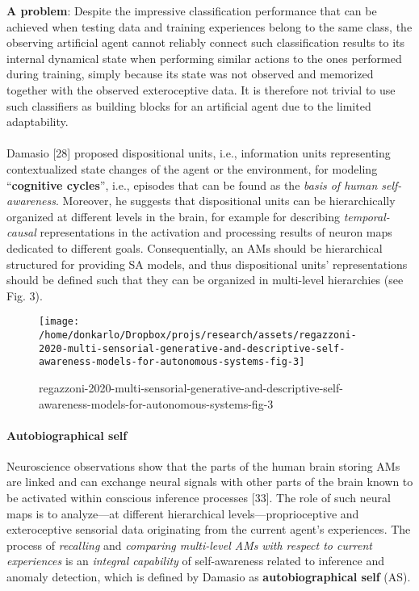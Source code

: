 \documentclass{article}
\begin{document}
			\textbf{A problem}: Despite the impressive classification performance that can be achieved when testing data and training experiences belong to
			the same class, the observing artificial agent cannot reliably connect such classification results to its internal dynamical state when performing similar actions to the ones performed during training, simply because its state was not observed and memorized together with the observed exteroceptive data. It is therefore not trivial to use such classifiers as building blocks for an artificial agent due to the limited adaptability. 
			
			\paragraph{} Damasio \citet{regazzoni-2020-multi-sensorial-generative-and-descriptive-self-awareness-models-for-autonomous-systems}[28] proposed dispositional units, i.e., information units representing contextualized state changes of the
			agent or the environment, for modeling “\textbf{cognitive cycles}”,
			i.e., episodes that can be found as the \emph{basis of human self-awareness}. Moreover, he suggests that dispositional units can
			be hierarchically organized at different levels in the brain, for
			example for describing \emph{temporal-causal} representations in the
			activation and processing results of neuron maps dedicated to
			different goals. Consequentially, an AMs should be hierarchical structured for providing SA models, and thus dispositional
			units’ representations should be defined such that they can be organized in multi-level hierarchies (see Fig. 3).
			\begin{figure*}
				\centering
				\texttt{[image: /home/donkarlo/Dropbox/projs/research/assets/regazzoni-2020-multi-sensorial-generative-and-descriptive-self-awareness-models-for-autonomous-systems-fig-3]}
				\caption{regazzoni-2020-multi-sensorial-generative-and-descriptive-self-awareness-models-for-autonomous-systems-fig-3}
				\label{fig:regazzoni-2020-multi-sensorial-generative-and-descriptive-self-awareness-models-for-autonomous-systems-fig-3.png}
			\end{figure*}
			
			\paragraph{Autobiographical self} Neuroscience observations show that the parts of the human
			brain storing AMs are linked and can exchange neural signals with other parts of the brain known to be activated within conscious inference processes [33]. The role of such neural maps is to analyze—at different hierarchical levels—proprioceptive and exteroceptive sensorial data originating from the current agent’s experiences. The process of \emph{recalling} and \emph{comparing multi-level AMs}\emph{ with respect to current experiences} is an \emph{integral capability} of self-awareness related to inference and anomaly detection, which is defined by Damasio as \textbf{autobiographical self} (AS). 
\end{document}
